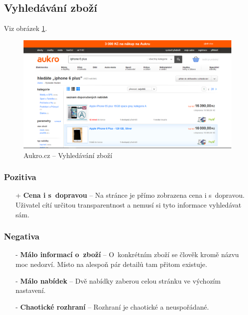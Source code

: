 
\newpage
\subsection{Vyhledávání zboží}
Viz obrázek \ref{fig:aukro:search}.
\begin{figure}[h]
    \centering
    \includegraphics[width=1.0\textwidth]{media/aukro/search.png}
    \caption{Aukro.cz -- Vyhledávání zboží}
    \label{fig:aukro:search}
\end{figure}
\subsubsection*{Pozitiva}
\begin{itemize}
    \item[+] \textbf{Cena i s~dopravou} -- Na stránce je přímo zobrazena cena i s~dopravou. Uživatel cítí určitou transparentnost a nemusí si tyto informace vyhledávat sám.
\end{itemize}
\subsubsection*{Negativa}
\begin{itemize}
    \item[-] \textbf{Málo informací o~zboží} -- O~konkrétním zboží se člověk kromě názvu moc nedozví. Místo na alespoň pár detailů tam přitom existuje.
    \item[-] \textbf{Málo nabídek} -- Dvě nabídky zaberou celou stránku ve výchozím nastavení.
    \item[-] \textbf{Chaotické rozhraní} -- Rozhraní je chaotické a neuspořádané.
\end{itemize}


